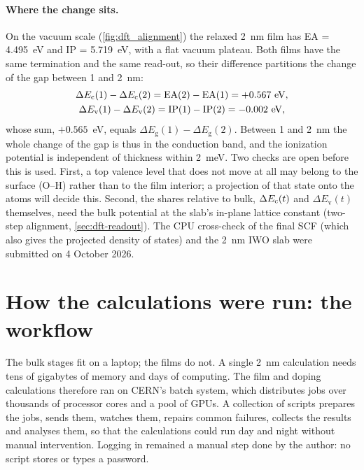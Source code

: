 \paragraph{Where the change sits.} On the vacuum scale (\cref{fig:dft_alignment}) the relaxed 2~nm film has EA = 4.495~eV
and IP = 5.719~eV, with a flat vacuum plateau. Both films have the same termination and the same read-out, so their
difference partitions the change of the gap between 1 and 2~nm:
\begin{equation}
\begin{gathered}
\Delta E_{\mathrm{c}}(1) - \Delta E_{\mathrm{c}}(2) = \mathrm{EA}(2) - \mathrm{EA}(1) = +0.567~\mathrm{eV}, \\
\Delta E_{\mathrm{v}}(1) - \Delta E_{\mathrm{v}}(2) = \mathrm{IP}(1) - \mathrm{IP}(2) = -0.002~\mathrm{eV},
\end{gathered}
\end{equation}
whose sum, $+0.565$~eV, equals $\Delta E_{\mathrm{g}}(1) - \Delta E_{\mathrm{g}}(2)$. Between 1 and 2~nm the whole change of
the gap is thus in the conduction band, and the ionization potential is independent of thickness within 2~meV. Two
checks are open before this is used. First, a top valence level that does not move at all may belong to the surface
(O--H) rather than to the film interior; a projection of that state onto the atoms will decide this. Second, the shares
relative to bulk, $\Delta E_{\mathrm{c}}(t)$ and $\Delta E_{\mathrm{v}}(t)$ themselves, need the bulk potential at the slab's in-plane
lattice constant (two-step alignment, \cref{sec:dft-readout}). The CPU cross-check of the final SCF (which also gives
the projected density of states) and the 2~nm IWO slab were submitted on 4 October 2026.

\section{How the calculations were run: the workflow}
\label{sec:dft-compute}

\begin{dftplain}
The bulk stages fit on a laptop; the films do not. A single 2~nm calculation needs tens of gigabytes of memory and days
of computing. The film and doping calculations therefore ran on CERN's batch system, which distributes jobs over
thousands of processor cores and a pool of GPUs. A collection of scripts prepares the jobs, sends them, watches them,
repairs common failures, collects the results and analyses them, so that the calculations could run day and night
without manual intervention. Logging in remained a manual step done by the author: no script stores or types a
password.
\end{dftplain}

